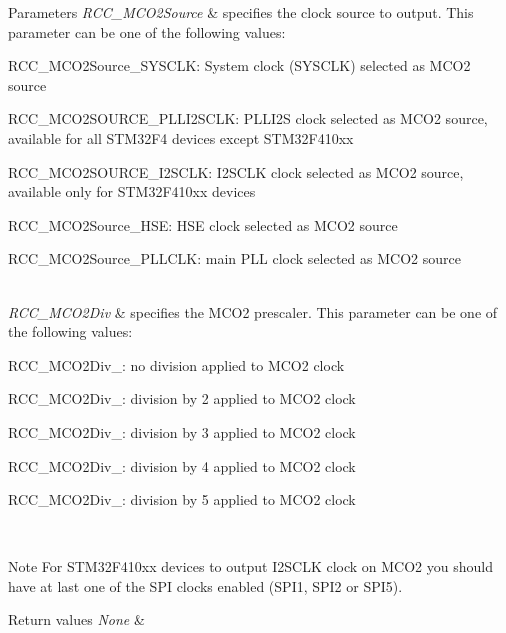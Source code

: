 \begin{DoxyParams}{Parameters}
{\em R\+C\+C\+\_\+\+M\+C\+O2\+Source} & specifies the clock source to output. This parameter can be one of the following values\+: \begin{DoxyItemize}
\item R\+C\+C\+\_\+\+M\+C\+O2\+Source\+\_\+\+S\+Y\+S\+C\+LK\+: System clock (S\+Y\+S\+C\+LK) selected as M\+C\+O2 source \item R\+C\+C\+\_\+\+M\+C\+O2\+S\+O\+U\+R\+C\+E\+\_\+\+P\+L\+L\+I2\+S\+C\+LK\+: P\+L\+L\+I2S clock selected as M\+C\+O2 source, available for all S\+T\+M32\+F4 devices except S\+T\+M32\+F410xx \item R\+C\+C\+\_\+\+M\+C\+O2\+S\+O\+U\+R\+C\+E\+\_\+\+I2\+S\+C\+LK\+: I2\+S\+C\+LK clock selected as M\+C\+O2 source, available only for S\+T\+M32\+F410xx devices ~\newline
 \item R\+C\+C\+\_\+\+M\+C\+O2\+Source\+\_\+\+H\+SE\+: H\+SE clock selected as M\+C\+O2 source \item R\+C\+C\+\_\+\+M\+C\+O2\+Source\+\_\+\+P\+L\+L\+C\+LK\+: main P\+LL clock selected as M\+C\+O2 source \end{DoxyItemize}
\\
\hline
{\em R\+C\+C\+\_\+\+M\+C\+O2\+Div} & specifies the M\+C\+O2 prescaler. This parameter can be one of the following values\+: \begin{DoxyItemize}
\item R\+C\+C\+\_\+\+M\+C\+O2\+Div\+\_\+: no division applied to M\+C\+O2 clock \item R\+C\+C\+\_\+\+M\+C\+O2\+Div\+\_\+: division by 2 applied to M\+C\+O2 clock \item R\+C\+C\+\_\+\+M\+C\+O2\+Div\+\_\+: division by 3 applied to M\+C\+O2 clock \item R\+C\+C\+\_\+\+M\+C\+O2\+Div\+\_\+: division by 4 applied to M\+C\+O2 clock \item R\+C\+C\+\_\+\+M\+C\+O2\+Div\+\_\+: division by 5 applied to M\+C\+O2 clock \end{DoxyItemize}
\\
\hline
\end{DoxyParams}
\begin{DoxyNote}{Note}
For S\+T\+M32\+F410xx devices to output I2\+S\+C\+LK clock on M\+C\+O2 you should have at last one of the S\+PI clocks enabled (S\+P\+I1, S\+P\+I2 or S\+P\+I5). 
\end{DoxyNote}

\begin{DoxyRetVals}{Return values}
{\em None} & \\
\hline
\end{DoxyRetVals}
\mbox{\label{group___r_c_c_ga448137346d4292985d4e7a61dd1a824f}} 
